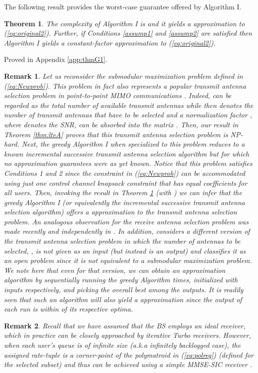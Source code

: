 \documentclass[11pt] {article}
\newtheorem{remark}{Remark}
\newtheorem{theorem}{Theorem}
\begin{document}
The following result provides the worst-case guarantee offered by Algorithm I.
\begin{theorem}\label{thmG1}
 The complexity of  Algorithm I is  and it yields a  approximation to (\ref{eq:original2}). Further, if Conditions \ref{assump1} and \ref{assump2} are satisfied  then
Algorithm I yields a constant-factor  approximation to (\ref{eq:original2}). \end{theorem}

\proof Proved in Appendix \ref{app:thmG1}.


\begin{remark}
Let us reconsider the submodular maximization problem defined in (\ref{eq:Newprob}). This problem in fact  also represents a popular transmit antenna selection problem in point-to-point MIMO communications \cite{sanayei:AS}. Indeed,  can be regarded as the total number of available transmit antennas while  then denotes the number of transmit antennas that have to be selected and a normalization  factor , where  denotes the SNR, can be absorbed into the matrix . Then, our result in Theorem \ref{thm:lteA}  proves that this transmit antenna selection problem is NP-hard. Next,   the greedy Algorithm I when specialized to this problem reduces to a known incremental successive transmit antenna selection algorithm \cite{sanayei:AS} but for which no approximation guarantees were as yet known. Notice that this problem satisfies Conditions 1 and 2 since the constraint in (\ref{eq:Newprob}) can be accommodated using just one control channel knapsack constraint that has  equal coefficients for all users. Then, invoking the result in Theorem  \ref{thmG1} (with ) we can infer that the greedy Algorithm I (or equivalently the incremental successive transmit antenna selection algorithm) offers a  approximation to the transmit antenna selection problem. An analogous observation for the receive antenna selection problem was made recently and independently in \cite{Txselectvaze}.  In addition, \cite{Txselectvaze}  considers a different version of the  transmit antenna selection problem   in which the number of antennas to be selected, , is not given as an input (but instead is an output) and classifies it as an open problem since it is not equivalent to a submodular maximization problem. We note here that  even for that version, we can obtain an approximation algorithm by sequentially running the greedy Algorithm  times, initialized with inputs  respectively, and picking the overall best among the  outputs. It is readily seen that such an algorithm will also yield a  approximation since the output of each run is within  of its respective optima.
\end{remark}
\begin{remark}
Recall that we have assumed that the BS employs an ideal receiver, which in practice can be closely approached by iterative Turbo receivers. However, when each user's queue is of infinite size (a.k.a infinitely backlogged case), the assigned rate-tuple   is a corner-point of the polymatroid in (\ref{eq:polreg}) (defined for the selected subset) and thus can be achieved using a simple MMSE-SIC receiver  \cite{VaranasiMK:ODF:Asil97}.
\end{remark}
\end{document}
